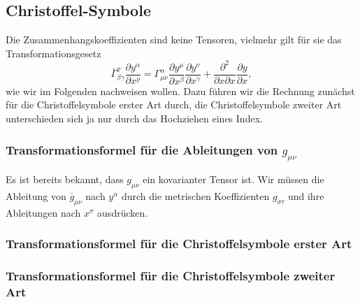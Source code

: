 \subsection{Christoffel-Symbole}
Die Zusammenhangskoeffizienten sind keine Tensoren, vielmehr gilt für sie das
Transformationsgesetz
\[
\bar\Gamma^\varrho_{\beta\gamma}
\frac{\partial y^\alpha}{\partial x^\varrho}
=
\Gamma^\alpha_{\mu\nu}
\frac{\partial y^\mu}{\partial x^\beta}
\frac{\partial y^\nu}{\partial x^\gamma}
+
\frac{\partial^2}{\partial x\partial x}
\frac{\partial y}{\partial x},
\]
wie wir im Folgenden nachweisen wollen.
Dazu führen wir die Rechnung zunächst für die Christoffelsymbole
erster Art durch, die Christoffelsymbole zweiter Art unterschieden sich
ja nur durch das Hochziehen eines Index.

\subsubsection{Transformationsformel für die Ableitungen von $g_{\mu\nu}$}
Es ist bereits bekannt, dass $g_{\mu\nu}$ ein kovarianter Tensor ist.
Wir müssen die Ableitung von $\bar g_{\mu\nu}$ nach $y^\alpha$ durch
die metrischen Koeffizienten $g_{\sigma\tau}$ und ihre Ableitungen
nach $x^\sigma$ ausdrücken.

\subsubsection{Transformationsformel für die Christoffelsymbole erster Art}

\subsubsection{Transformationsformel für die Christoffelsymbole zweiter Art}



